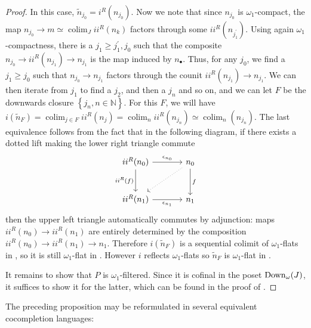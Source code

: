 \documentclass[a4paper,10pt, oneside]{amsart}
\begin{document}
\begin{proof}
	In this case, $\tilde{n}_{j_0}=i^R(n_{j_0})$. Now we note that since $n_{j_0}$ is $\omega_1$-compact, the map $n_{j_0} \rightarrow m \simeq \operatorname{colim}_J i i^R(n_k)$ factors through some $i i^R(n_{j_1^{\prime}})$. Using again $\omega_1$-compactness, there is a $j_1 \geq j_1^{\prime}, j_0$ such that the composite $n_{j_0} \rightarrow i i^R(n_{j_1}) \rightarrow n_{j_1}$ is the map induced by $n_{\bullet}$. Thus, for any $j_0$, we find a $j_1 \geq j_0$ such that $n_{j_0} \rightarrow n_{j_1}$ factors through the counit $i i^R(n_{j_1}) \rightarrow n_{j_1}$. We can then iterate from $j_1$ to find a $j_2$, and then a $j_n$ and so on, and we can let $F$ be the downwards closure $\left\{j_n, n \in \mathbb{N}\right\}$. For this $F$, we will have $i(\tilde{n}_F)=\operatorname{colim}_{j \in F} ii^R\left(n_j\right)=\operatorname{colim}_n ii^R\left(n_{j_n}\right) \simeq \operatorname{colim}_n (n_{j_n})$. The last equivalence follows from the fact that in the following diagram, if there exists a dotted lift making the lower right triangle commute
	$$\begin{tikzcd}[row sep=large, column sep=large]
		ii^R(n_0) \arrow[r, "\epsilon_{n_0}"] \arrow[d, "ii^R(f)"'] & n_0 \arrow[d, "f"] \arrow[ld, dotted] \\
		ii^R(n_1) \arrow[r, "\epsilon_{n_1}"'] & n_1
	\end{tikzcd}$$
	then the upper left triangle automatically commutes by adjunction: maps $ii^R(n_0) \to ii^R(n_1)$
	are entirely determined by the composition $ii^R(n_0) \to ii^R(n_1) \to n_1$.
	Therefore $i(\tilde{n}_F)$ is a sequential colimit of $\omega_1$-flats in \mcn, so it is still $\omega_1$-flat in \mcn. However  $i$ reflects $\omega_1$-flats so $\tilde{n}_F$ is  $\omega_1$-flat in \mcc.
	
	It remains to show that $P$ is $\omega_1$-filtered. Since it is cofinal in the poset $\mathrm{Down}_\omega(J)$, it suffices to show it for the
	latter, which can be found in the proof of \cite[Corollary 2.34]{ramzi2024dualizable}.
\end{proof}
The preceding proposition may be reformulated in several equivalent cocompletion languages:
\end{document}
